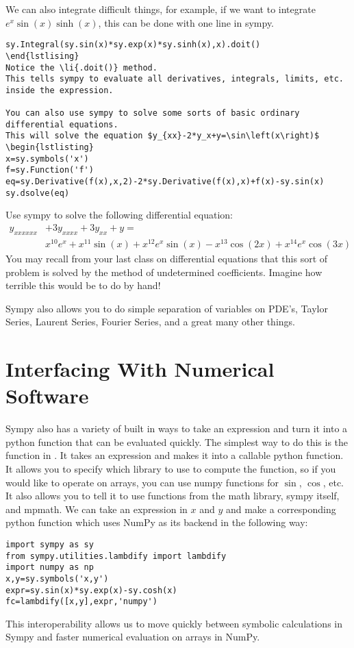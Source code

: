 We can also integrate difficult things, for example, if we want to integrate $e^x\sin(x)\sinh(x)$, this can be done with one line in sympy.
\begin{lstlisting}
sy.Integral(sy.sin(x)*sy.exp(x)*sy.sinh(x),x).doit()
\end{lstlising}
Notice the \li{.doit()} method.
This tells sympy to evaluate all derivatives, integrals, limits, etc. inside the expression.

You can also use sympy to solve some sorts of basic ordinary differential equations.
This will solve the equation $y_{xx}-2*y_x+y=\sin\left(x\right)$
\begin{lstlisting}
x=sy.symbols('x')
f=sy.Function('f')
eq=sy.Derivative(f(x),x,2)-2*sy.Derivative(f(x),x)+f(x)-sy.sin(x)
sy.dsolve(eq)
\end{lstlisting}

\begin{problem}
Use sympy to solve the following differential equation:
\begin{equation*}
\begin{split}
 y_{xxxxxx} & + 3y_{xxxx} + 3y_{xx} + y = \\
& x^{10}e^x + x^{11}\sin\left(x\right) + x^{12}e^x\sin\left(x\right) -x^{13}\cos\left(2x\right) + x^{14}e^x\cos\left(3x\right)
\end{split}
\end{equation*}
You may recall from your last class on differential equations that this sort of problem is solved by the method of undetermined coefficients. 
Imagine how terrible this would be to do by hand!
\end{problem}

Sympy also allows you to do simple separation of variables on PDE's, Taylor Series, Laurent Series, Fourier Series, and a great many other things.

\section*{Interfacing With Numerical Software}
Sympy also has a variety of built in ways to take an expression and turn it into a python function that can be evaluated quickly.
The simplest way to do this is the  function in .
It takes an expression and makes it into a callable python function. 
It allows you to specify which library to use to compute the function, so if you would like to operate on arrays, you can use numpy functions for $\sin$, $\cos$, etc.
It also allows you to tell it to use functions from the math library, sympy itself, and mpmath.
We can take an expression in $x$ and $y$ and make a corresponding python function  which uses NumPy as its backend in the following way:
\begin{lstlisting}
import sympy as sy
from sympy.utilities.lambdify import lambdify
import numpy as np
x,y=sy.symbols('x,y')
expr=sy.sin(x)*sy.exp(x)-sy.cosh(x)
fc=lambdify([x,y],expr,'numpy')
\end{lstlisting}
This interoperability allows us to move quickly between symbolic calculations in Sympy and faster numerical evaluation on arrays in NumPy.

